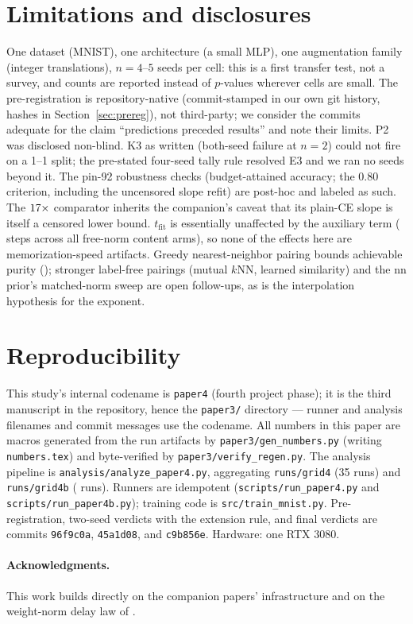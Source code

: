 \documentclass[11pt]{article}
\newcommand{\tfit}{t_{\mathrm{fit}}}
\begin{document}
\section{Limitations and disclosures}
\label{sec:limits}

One dataset (MNIST), one architecture (a small MLP), one augmentation family (integer
translations), $n{=}4$--$5$ seeds per cell: this is a first transfer test, not a survey, and
counts are reported instead of $p$-values wherever cells are small. The pre-registration is
repository-native (commit-stamped in our own git history, hashes in
Section~\ref{sec:prereg}), not third-party; we consider the commits adequate for the claim
``predictions preceded results'' and note their limits. P2 was disclosed non-blind. K3 as
written (both-seed failure at $n{=}2$) could not fire on a 1--1 split; the pre-stated
four-seed tally rule resolved E3 and we ran no seeds beyond it. The pin-92 robustness checks
(budget-attained accuracy; the $0.80$ criterion, including the uncensored slope refit) are
post-hoc and labeled as such. The
$17\times$ comparator inherits the companion's caveat that its plain-CE slope is itself a
censored lower bound. $\tfit$ is essentially unaffected by the auxiliary term
(\pfTfitFreeRange{} steps across all free-norm content arms), so none of the effects here are
memorization-speed artifacts. Greedy nearest-neighbor pairing bounds achievable purity
(\pfNnPurityRange); stronger label-free pairings (mutual $k$NN, learned similarity) and the nn
prior's matched-norm sweep are open follow-ups, as is the interpolation hypothesis for the
exponent.

\section{Reproducibility}
\label{sec:repro}

\begin{sloppypar}
This study's internal codename is \texttt{paper4} (fourth project phase); it is the third
manuscript in the repository, hence the \texttt{paper3/} directory --- runner and analysis
filenames and commit messages use the codename.
All numbers in this paper are macros generated from the run artifacts by
\texttt{paper3/gen\_numbers.py} (writing \texttt{numbers.tex}) and byte-verified by
\texttt{paper3/verify\_regen.py}. The analysis pipeline is
\texttt{analysis/analyze\_paper4.py}, aggregating \texttt{runs/grid4} (35 runs) and
\texttt{runs/grid4b} (\pfAmendRuns{} runs). Runners are idempotent
(\texttt{scripts/run\_paper4.py} and \texttt{scripts/run\_paper4b.py}); training code is
\texttt{src/train\_mnist.py}. Pre-registration, two-seed verdicts with the extension rule, and
final verdicts are commits \texttt{96f9c0a}, \texttt{45a1d08}, and \texttt{c9b856e}. Hardware:
one RTX 3080.
\end{sloppypar}

\paragraph{Acknowledgments.} This work builds directly on the companion papers'
infrastructure and on the weight-norm delay law of \citet{weightnormdelay2026}.



\end{document}
